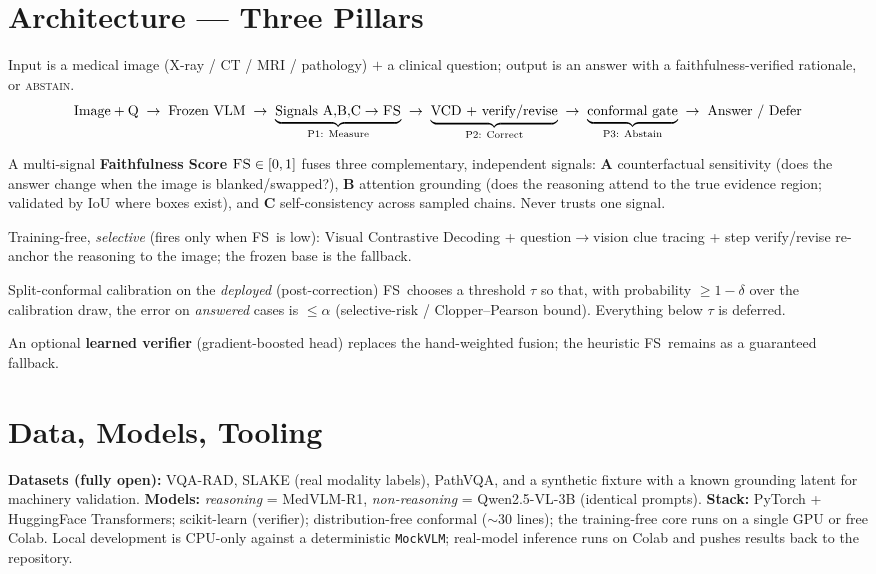 \documentclass[11pt]{article}
\newcommand{\fs}{\textsc{FS}}
\begin{document}
\section{Architecture --- Three Pillars}
Input is a medical image (X-ray / CT / MRI / pathology) $+$ a clinical question; output is an
answer with a faithfulness-verified rationale, or \textsc{abstain}.
\[
\text{Image}+\text{Q}\;\to\;\text{Frozen VLM}\;\to\;
\underbrace{\text{Signals A,B,C}\to\fs}_{\text{P1: Measure}}\;\to\;
\underbrace{\text{VCD + verify/revise}}_{\text{P2: Correct}}\;\to\;
\underbrace{\text{conformal gate}}_{\text{P3: Abstain}}\;\to\;\text{Answer / Defer}
\]
\begin{description}[leftmargin=1.4em,itemsep=1pt]
  \item[Pillar 1 --- Measurement.] A multi-signal \textbf{Faithfulness Score} $\fs\in[0,1]$
        fuses three complementary, independent signals:
        \textbf{A} counterfactual sensitivity (does the answer change when the image is
        blanked/swapped?), \textbf{B} attention grounding (does the reasoning attend to the
        true evidence region; validated by IoU where boxes exist), and \textbf{C}
        self-consistency across sampled chains. Never trusts one signal.
  \item[Pillar 2 --- Correction.] Training-free, \emph{selective} (fires only when \fs\ is
        low): Visual Contrastive Decoding + question$\to$vision clue tracing + step
        verify/revise re-anchor the reasoning to the image; the frozen base is the fallback.
  \item[Pillar 3 --- Abstention.] Split-conformal calibration on the \emph{deployed}
        (post-correction) \fs\ chooses a threshold $\tau$ so that, with probability
        $\ge 1-\delta$ over the calibration draw, the error on \emph{answered} cases is
        $\le\alpha$ (selective-risk / Clopper--Pearson bound). Everything below $\tau$ is
        deferred.
\end{description}
An optional \textbf{learned verifier} (gradient-boosted head) replaces the hand-weighted
fusion; the heuristic \fs\ remains as a guaranteed fallback.

\section{Data, Models, Tooling}
\textbf{Datasets (fully open):} VQA-RAD, SLAKE (real modality labels), PathVQA, and a
synthetic fixture with a known grounding latent for machinery validation.
\textbf{Models:} \emph{reasoning} = MedVLM-R1, \emph{non-reasoning} = Qwen2.5-VL-3B (identical
prompts). \textbf{Stack:} PyTorch + HuggingFace Transformers; scikit-learn (verifier);
distribution-free conformal ($\sim$30 lines); the training-free core runs on a single GPU or
free Colab. Local development is CPU-only against a deterministic \texttt{MockVLM}; real-model
inference runs on Colab and pushes results back to the repository.
\end{document}
